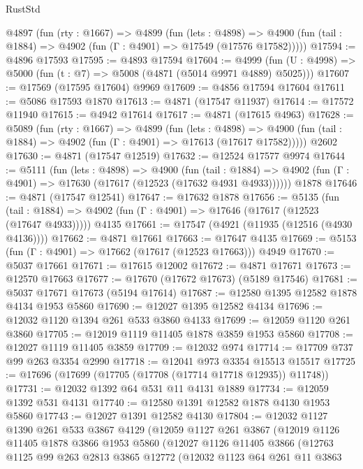 \begin{lexlean}{RustStd}
\begin{coremodule}
{\begin{coremodule}
{{{{{{{{{{{{{{{{{{{{{{{{{{{{{  @4897
    (fun (rty : @1667) =>
    @4899
      (fun (lets : @4898) =>
      @4900 (fun (tail : @1884) => @4902 (fun (Γ : @4901) => @17549 (@17576 @17582)))))
@17594 := @4896 @17593
@17595 := @4893 @17594
@17604 := @4999 (fun (U : @4998) => @5000 (fun (t : @7) => @5008 (@4871 (@5014 @9971 @4889) @5025)))
@17607 := @17569 (@17595 @17604) @9969
@17609 := @4856 @17594 @17604
@17611 := @5086 @17593 @1870
@17613 := @4871 (@17547 @11937)
@17614 := @17572 @11940
@17615 := @4942 @17614
@17617 := @4871 (@17615 @4963)
@17628 := @5089
    (fun (rty : @1667) =>
    @4899
      (fun (lets : @4898) =>
      @4900 (fun (tail : @1884) => @4902 (fun (Γ : @4901) => @17613 (@17617 @17582)))))
    @2602
@17630 := @4871 (@17547 @12519)
@17632 := @12524 @17577 @9974
@17644 := @5111
    (fun (lets : @4898) =>
    @4900
      (fun (tail : @1884) =>
      @4902 (fun (Γ : @4901) => @17630 (@17617 (@12523 (@17632 @4931 @4933))))))
    @1878
@17646 := @4871 (@17547 @12541)
@17647 := @17632 @1878
@17656 := @5135
    (fun (tail : @1884) => @4902 (fun (Γ : @4901) => @17646 (@17617 (@12523 (@17647 @4933)))))
    @4135
@17661 := @17547 (@4921 (@11935 (@12516 (@4930 @4136))))
@17662 := @4871 @17661
@17663 := @17647 @4135
@17669 := @5153 (fun (Γ : @4901) => @17662 (@17617 (@12523 @17663))) @4949
@17670 := @5037 @17661
@17671 := @17615 @12002
@17672 := @4871 @17671
@17673 := @12570 @17663
@17677 := @17670 (@17672 @17673) (@5189 @17546)
@17681 := @5037 @17671 @17673 (@5194 @17614)
@17687 := @12580 @1395 @12582 @1878 @4134 @1953 @5860
@17690 := @12027 @1395 @12582 @4134
@17696 := @12032 @1120 @1394 @261 @533 @3860 @4133
@17699 := @12059 @1120 @261 @3860
@17705 := @12019 @1119 @11405 @1878 @3859 @1953 @5860
@17708 := @12027 @1119 @11405 @3859
@17709 := @12032 @974
@17714 := @17709 @737 @99 @263 @3354 @2990
@17718 := @12041 @973 @3354 @15513 @15517
@17725 := @17696 (@17699 (@17705 (@17708 (@17714 @17718 @12935)) @11748))
@17731 := @12032 @1392 @64 @531 @11 @4131 @1889
@17734 := @12059 @1392 @531 @4131
@17740 := @12580 @1391 @12582 @1878 @4130 @1953 @5860
@17743 := @12027 @1391 @12582 @4130
@17804 := @12032
    @1127
    @1390
    @261
    @533
    @3867
    @4129
    (@12059
      @1127
      @261
      @3867
      (@12019
        @1126
        @11405
        @1878
        @3866
        @1953
        @5860
        (@12027
          @1126
          @11405
          @3866
          (@12763
            @1125
            @99
            @263
            @2813
            @3865
            @12772
            (@12032
              @1123
              @64
              @261
              @11
              @3863
}}}}}}}}}}}}}}}}}}}}}}}}}}}}}
\end{coremodule}}
\end{coremodule}
\end{lexlean}

